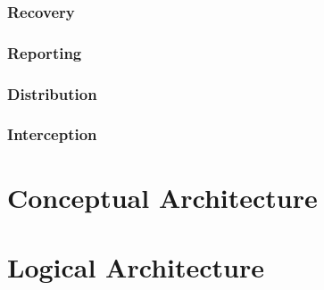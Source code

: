 \documentclass[a4paper]{book}
\begin{document}
\subsubsection{Recovery}
\subsubsection{Reporting}
\subsubsection{Distribution}
\subsubsection{Interception}

\section{Conceptual Architecture}
\section{Logical Architecture}
\end{document}
